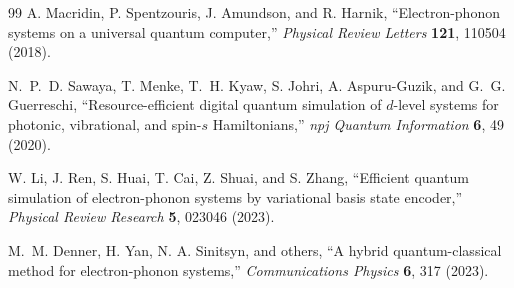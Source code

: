 \documentclass[
  reprint,
  amsmath,
  amssymb,
  aps,
  pra,
  nofootinbib,
  superscriptaddress,
  floatfix
]{revtex4-2}
\begin{document}
\begin{thebibliography}{99}
A. Macridin, P. Spentzouris, J. Amundson, and R. Harnik,
``Electron-phonon systems on a universal quantum computer,''
\emph{Physical Review Letters} \textbf{121}, 110504 (2018).

N.~P.~D. Sawaya, T. Menke, T.~H. Kyaw, S. Johri, A. Aspuru-Guzik, and G.~G. Guerreschi,
``Resource-efficient digital quantum simulation of $d$-level systems for photonic, vibrational, and spin-$s$ Hamiltonians,''
\emph{npj Quantum Information} \textbf{6}, 49 (2020).

W. Li, J. Ren, S. Huai, T. Cai, Z. Shuai, and S. Zhang,
``Efficient quantum simulation of electron-phonon systems by variational basis state encoder,''
\emph{Physical Review Research} \textbf{5}, 023046 (2023).

M.~M. Denner, H. Yan, N. A. Sinitsyn, and others,
``A hybrid quantum-classical method for electron-phonon systems,''
\emph{Communications Physics} \textbf{6}, 317 (2023).

\end{thebibliography}
\end{document}
